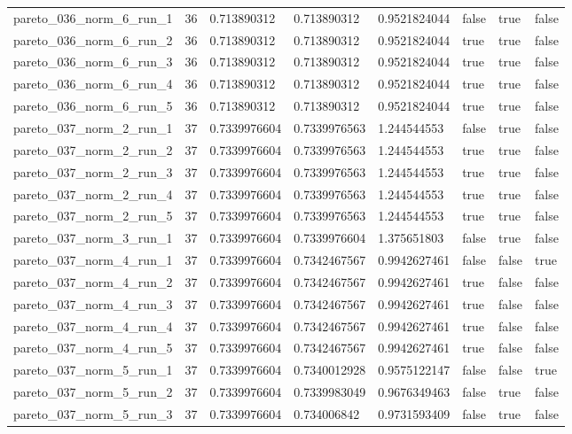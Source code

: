 \begin{tabular}{@{}llllllll@{}}
pareto\_036\_norm\_6\_run\_1 & 36 & 0.713890312 & 0.713890312 & 0.9521824044 & false & true & false \\
pareto\_036\_norm\_6\_run\_2 & 36 & 0.713890312 & 0.713890312 & 0.9521824044 & true & true & false \\
pareto\_036\_norm\_6\_run\_3 & 36 & 0.713890312 & 0.713890312 & 0.9521824044 & true & true & false \\
pareto\_036\_norm\_6\_run\_4 & 36 & 0.713890312 & 0.713890312 & 0.9521824044 & true & true & false \\
pareto\_036\_norm\_6\_run\_5 & 36 & 0.713890312 & 0.713890312 & 0.9521824044 & true & true & false \\
pareto\_037\_norm\_2\_run\_1 & 37 & 0.7339976604 & 0.7339976563 & 1.244544553 & false & true & false \\
pareto\_037\_norm\_2\_run\_2 & 37 & 0.7339976604 & 0.7339976563 & 1.244544553 & true & true & false \\
pareto\_037\_norm\_2\_run\_3 & 37 & 0.7339976604 & 0.7339976563 & 1.244544553 & true & true & false \\
pareto\_037\_norm\_2\_run\_4 & 37 & 0.7339976604 & 0.7339976563 & 1.244544553 & true & true & false \\
pareto\_037\_norm\_2\_run\_5 & 37 & 0.7339976604 & 0.7339976563 & 1.244544553 & true & true & false \\
pareto\_037\_norm\_3\_run\_1 & 37 & 0.7339976604 & 0.7339976604 & 1.375651803 & false & true & false \\
pareto\_037\_norm\_4\_run\_1 & 37 & 0.7339976604 & 0.7342467567 & 0.9942627461 & false & false & true \\
pareto\_037\_norm\_4\_run\_2 & 37 & 0.7339976604 & 0.7342467567 & 0.9942627461 & true & false & false \\
pareto\_037\_norm\_4\_run\_3 & 37 & 0.7339976604 & 0.7342467567 & 0.9942627461 & true & false & false \\
pareto\_037\_norm\_4\_run\_4 & 37 & 0.7339976604 & 0.7342467567 & 0.9942627461 & true & false & false \\
pareto\_037\_norm\_4\_run\_5 & 37 & 0.7339976604 & 0.7342467567 & 0.9942627461 & true & false & false \\
pareto\_037\_norm\_5\_run\_1 & 37 & 0.7339976604 & 0.7340012928 & 0.9575122147 & false & false & true \\
pareto\_037\_norm\_5\_run\_2 & 37 & 0.7339976604 & 0.7339983049 & 0.9676349463 & false & true & false \\
pareto\_037\_norm\_5\_run\_3 & 37 & 0.7339976604 & 0.734006842 & 0.9731593409 & false & true & false \\

\end{tabular}
